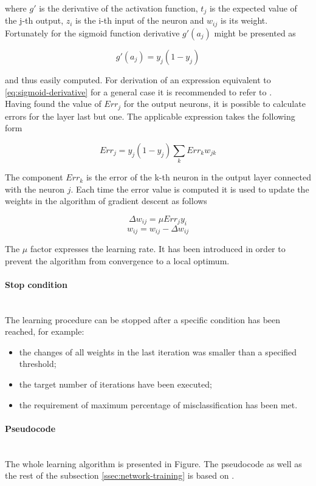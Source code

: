 \documentclass[11pt,oneside, a4paper]{report}
\begin{document}
where $g'$ is the derivative of the activation function, $t_j$ is the expected value of the j-th output, $z_i$ is the i-th input of the neuron and $w_{ij}$ is its weight. Fortunately for the sigmoid function derivative $g'(a_j)$ might be presented as

\begin{equation} \label{eq:sigmoid-derivative}
g'(a_j) = y_j (1 - y_j)
\end{equation}

and thus easily computed. For derivation of an expression equivalent to \ref{eq:sigmoid-derivative} for a general case it is recommended to refer to \cite{BISHOP1995}.
\\
Having found the value of $Err_j$ for the output neurons, it is possible to calculate errors for the layer last but one. The applicable expression takes the following form

\begin{equation}
Err_j = y_j(1-y_j) \sum_{k} Err_k w_{jk}
\end{equation}

The component $Err_k$ is the error of the k-th neuron in the output layer connected with the neuron $j$. Each time the error value is computed it is used to update the weights in the algorithm of gradient descent as follows

\begin{equation}
\Delta w_{ij} = \mu Err_j y_i
\end{equation}
\begin{equation}
w_{ij} = w_{ij} - \Delta w_{ij}
\end{equation}

The $\mu$ factor expresses the learning rate. It has been introduced in order to prevent the algorithm from convergence to a local optimum.

\paragraph{Stop condition}\mbox{}\\
The learning procedure can be stopped after a specific condition has been reached, for example:
\begin{itemize}
	\item the changes of all weights in the last iteration was smaller than a specified threshold; 
	\item the target number of iterations have been executed;
	\item the requirement of maximum percentage of misclassification has been met.
\end{itemize}

\paragraph{Pseudocode}\mbox{}\\
The whole learning algorithm is presented in Figure. The pseudocode as well as the rest of the subsection \ref{ssec:network-training} is based on \cite{HAN2005}.



{}

\end{document}
